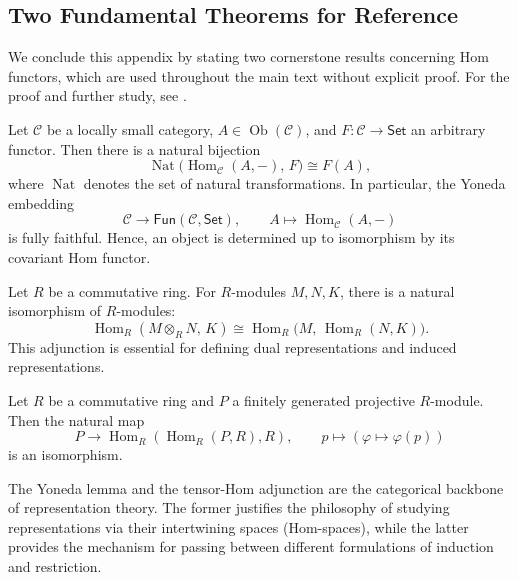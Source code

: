 \subsection{Two Fundamental Theorems for Reference}

We conclude this appendix by stating two cornerstone results concerning Hom functors, which are used throughout the main text without explicit proof.
For the proof and further study, see \cite{maclane1978categories}.

\begin{thm}
Let $\mathcal{C}$ be a locally small category, $A \in \operatorname{Ob}(\mathcal{C})$, and $F: \mathcal{C} \to \mathsf{Set}$ an arbitrary functor. Then there is a natural bijection
\[
\operatorname{Nat}\big(\operatorname{Hom}_{\mathcal{C}}(A, -), \, F\big) \cong F(A),
\]
where $\operatorname{Nat}$ denotes the set of natural transformations. In particular, the Yoneda embedding
\[
\mathcal{C} \longrightarrow \mathsf{Fun}(\mathcal{C}, \mathsf{Set}), \qquad A \longmapsto \operatorname{Hom}_{\mathcal{C}}(A, -)
\]
is fully faithful. Hence, an object is determined up to isomorphism by its covariant Hom functor.
\end{thm}

\begin{thm}
Let $R$ be a commutative ring. For $R$-modules $M, N, K$, there is a natural isomorphism of $R$-modules:
\[
\operatorname{Hom}_R(M \otimes_R N, \, K) \cong \operatorname{Hom}_R\big(M, \, \operatorname{Hom}_R(N, K)\big).
\]
This adjunction is essential for defining dual representations and induced representations.
\end{thm}
\begin{cor}
Let $R$ be a commutative ring and $P$ a finitely generated projective $R$-module. Then the natural map
\[
P \to\operatorname{Hom}_R(\operatorname{Hom}_R(P, R), R), \qquad p \mapsto (\varphi \mapsto \varphi(p))
\]
is an isomorphism. 
\end{cor}
\begin{remark}
The Yoneda lemma and the tensor-Hom adjunction are the categorical backbone of representation theory. The former justifies the philosophy of studying representations via their intertwining spaces (Hom-spaces), while the latter provides the mechanism for passing between different formulations of induction and restriction.
\end{remark}
